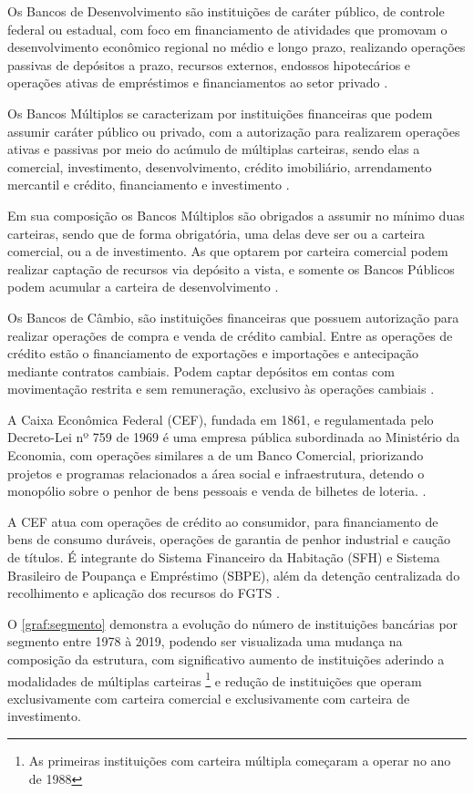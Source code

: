 \documentclass[
  12pt,
  12pt,
  openright,
  oneside,
  a4paper,
  chapter=TITLE,
  section=TITLE,
  subsection=TITLE,
  subsubsection=TITLE,
  portugues,
  sumario=tradicional]{abntex2}
\begin{document}
Os Bancos de Desenvolvimento são instituições de caráter público, de controle federal ou estadual, com foco em financiamento de atividades que promovam o desenvolvimento econômico regional no médio e longo prazo, realizando operações passivas de depósitos a prazo, recursos externos, endossos hipotecários e operações ativas de empréstimos e financiamentos ao setor privado \cite{Res:394:1976}.

Os Bancos Múltiplos se caracterizam por instituições financeiras que podem assumir caráter público ou privado, com a autorização para realizarem operações ativas e passivas por meio do acúmulo de múltiplas carteiras, sendo elas a comercial, investimento, desenvolvimento, crédito imobiliário, arrendamento mercantil e crédito, financiamento e investimento \cite{Res:2099:1994}.

Em sua composição os Bancos Múltiplos são obrigados a assumir no mínimo duas carteiras, sendo que de forma obrigatória, uma delas deve ser ou a carteira comercial, ou a de investimento. As que optarem por carteira comercial podem realizar captação de recursos via depósito a vista, e somente os Bancos Públicos podem acumular a carteira de desenvolvimento \cite{Res:2099:1994}.

Os Bancos de Câmbio, são instituições financeiras que possuem autorização para realizar operações de compra e venda de crédito cambial. Entre as operações de crédito estão o financiamento de exportações e importações e antecipação mediante contratos cambiais. Podem captar depósitos em contas com movimentação restrita e sem remuneração, exclusivo às operações cambiais \cite{Res:3426:2006}.

A Caixa Econômica Federal (CEF), fundada em 1861, e regulamentada pelo Decreto-Lei nº 759 de 1969 é uma empresa pública subordinada ao Ministério da Economia, com operações similares a de um Banco Comercial, priorizando projetos e programas relacionados a área social e infraestrutura, detendo o monopólio sobre o penhor de bens pessoais e venda de bilhetes de loteria. \cite{DL:759:1969}.

A CEF atua com operações de crédito ao consumidor, para financiamento de bens
de consumo duráveis, operações de garantia de penhor industrial e caução de
títulos. É integrante do Sistema Financeiro da Habitação (SFH) e Sistema
Brasileiro de Poupança e Empréstimo (SBPE), além da detenção centralizada do recolhimento e aplicação dos recursos do FGTS \cite{DL:759:1969}.

O \autoref{graf:segmento} demonstra a evolução do número de instituições bancárias por segmento entre 1978 à 2019, podendo ser visualizada uma mudança na composição da estrutura, com significativo aumento de instituições aderindo a modalidades de múltiplas carteiras \footnote{As primeiras instituições com carteira múltipla começaram a operar no ano de 1988} e redução de instituições que operam exclusivamente com carteira comercial e exclusivamente com carteira
de investimento.
\end{document}
